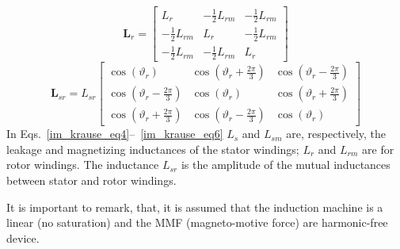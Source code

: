 \documentclass[12pt,a4paper,oneside]{book}
\begin{document}
\begin{onehalfspace}
\begin{equation}
\end{equation}
\begin{equation}\label{im_krause_eq5}
	\mathbf{L}_{r} = \begin{bmatrix} L_r & -\frac{1}{2}L_{rm} & -\frac{1}{2}L_{rm} \\[6pt] -\frac{1}{2}L_{rm} & L_r & -\frac{1}{2}L_{rm} \\[6pt] -\frac{1}{2}L_{rm} & -\frac{1}{2}L_{rm} & L_r \end{bmatrix}
\end{equation}
\begin{equation}\label{im_krause_eq6}
	\mathbf{L}_{sr} = {L}_{sr}\begin{bmatrix} \cos(\vartheta_r) & \cos(\vartheta_r+\frac{2\pi}{3}) & \cos(\vartheta_r-\frac{2\pi}{3}) \\[6pt] \cos(\vartheta_r-\frac{2\pi}{3}) & \cos(\vartheta_r) & \cos(\vartheta_r+\frac{2\pi}{3}) \\[6pt] \cos(\vartheta_r+\frac{2\pi}{3}) & \cos(\vartheta_r-\frac{2\pi}{3}) & \cos(\vartheta_r) \end{bmatrix}
\end{equation}
In Eqs.~\eqref{im_krause_eq4}--~\eqref{im_krause_eq6} $L_s$ and $L_{sm}$ are, respectively, the leakage and magnetizing inductances of the stator windings; $L_r$ and $L_{rm}$ are for rotor windings. The inductance $L_{sr}$ is the amplitude of the mutual inductances between stator and rotor windings.

It is important to remark, that, it is assumed that the induction machine is a linear (no saturation) and the MMF (magneto-motive force) are harmonic-free device.


\end{onehalfspace}
\end{document}
